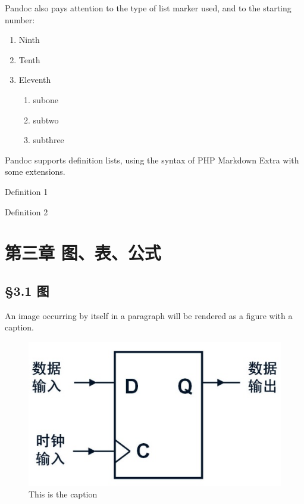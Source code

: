 \documentclass[]{article}
\providecommand{\tightlist}{%
  \setlength{\itemsep}{0pt}\setlength{\parskip}{0pt}}
\begin{document}
Pandoc also pays attention to the type of list marker used, and to the
starting number:

\begin{enumerate}
\def\labelenumi{\arabic{enumi})}
\setcounter{enumi}{8}
\tightlist
\item
  Ninth
\item
  Tenth
\item
  Eleventh

  \begin{enumerate}
  \def\labelenumii{\roman{enumii}.}
  \tightlist
  \item
    subone
  \item
    subtwo
  \item
    subthree
  \end{enumerate}
\end{enumerate}

Pandoc supports definition lists, using the syntax of PHP Markdown Extra
with some extensions.

\begin{description}
\tightlist
\item[Term 1]
Definition 1
\item[Term 2]
Definition 2
\end{description}

\hypertarget{sec:sec3}{%
\section{第三章 图、表、公式}\label{sec:sec3}}

\hypertarget{sec:ux56fe}{%
\subsection{§3.1 图}\label{sec:ux56fe}}

An image occurring by itself in a paragraph will be rendered as a figure
with a caption.

\begin{figure}
\hypertarget{fig:figure0}{%
\centering
\includegraphics{media/image2.jpeg}
\caption{This is the caption}\label{fig:figure0}
}
\end{figure}
\end{document}
